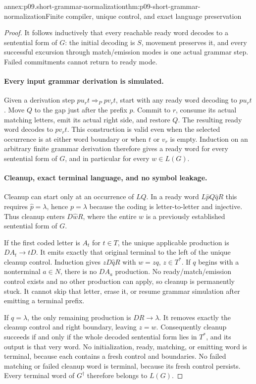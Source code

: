 \begin{annexitem}{annex:p09.short-grammar-normalization}{thm:p09-short-grammar-normalization}{Finite compiler, unique control, and exact language preservation}
\begin{proof}
It follows inductively that every reachable ready word decodes to a
sentential form of \(G\): the initial decoding is \(S\), movement
preserves it, and every successful excursion through match/emission modes
is one actual grammar step. Failed commitments cannot return to ready mode.

\paragraph{Every input grammar derivation is simulated.}
Given a derivation step \(pu_rt\Longrightarrow_P pv_rt\), start with
any ready word decoding to \(pu_rt\). Move \(Q\) to the gap just after
the prefix \(p\). Commit to \(r\), consume its actual matching letters,
emit its actual right side, and restore \(Q\).
The resulting ready word decodes to \(pv_rt\).
This construction is valid even when the selected occurrence is at either
word boundary or when \(t\) or \(v_r\) is empty.
Induction on an arbitrary finite grammar derivation therefore gives a ready
word for every sentential form of \(G\), and in particular for every
\(w\in L(G)\).

\paragraph{Cleanup, exact terminal language, and no symbol leakage.}
Cleanup can start only at an occurrence of \(LQ\).
In a ready word \(L\widehat pQ\widehat qR\) this requires
\(\widehat p=\lambda\), hence \(p=\lambda\) because the coding is
letter-to-letter and injective. Thus cleanup enters \(D\widehat wR\),
where the entire \(w\) is a previously established sentential form of \(G\).

If the first coded letter is \(A_t\) for \(t\in T\), the unique
applicable production is \(DA_t\to tD\). It emits exactly that original
terminal to the left of the unique cleanup control. Induction gives
\(zD\widehat qR\) with \(w=zq\), \(z\in T^*\).
If \(q\) begins with a nonterminal \(a\in N\), there is no \(DA_a\)
production. No ready/match/emission control exists and no other production
can apply, so cleanup is permanently stuck. It cannot skip that letter,
erase it, or resume grammar simulation after emitting a terminal prefix.

If \(q=\lambda\), the only remaining production is \(DR\to\lambda\).
It removes exactly the cleanup control and right boundary, leaving \(z=w\).
Consequently cleanup succeeds if and only if the whole decoded sentential
form lies in \(T^*\), and its output is that very word.
No initialization, ready, matching, or emitting word is terminal, because
each contains a fresh control and boundaries. No failed matching or failed
cleanup word is terminal, because its fresh control persists.
Every terminal word of \(G^\dagger\) therefore belongs to \(L(G)\).


\end{proof}
\end{annexitem}
